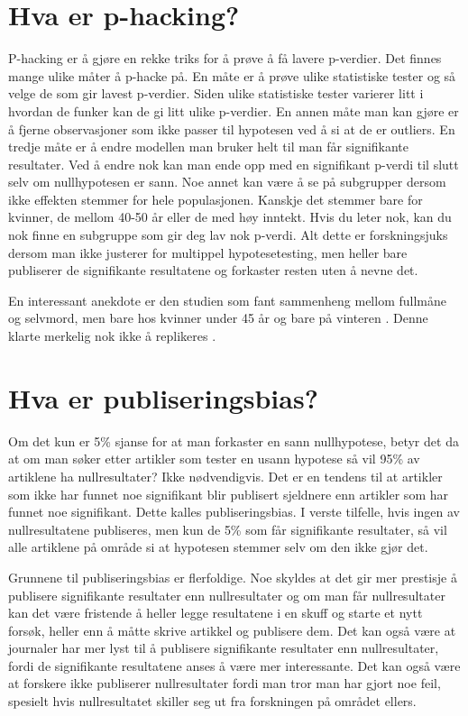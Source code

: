 \documentclass[doc,norsk]{apa7}
\begin{document}
\section{Hva er p-hacking?}
P-hacking er å gjøre en rekke triks for å prøve å få lavere p-verdier. Det finnes mange ulike måter å p-hacke på. En måte er å prøve ulike statistiske tester og så velge de som gir lavest p-verdier. Siden ulike statistiske tester varierer litt i hvordan de funker kan de gi litt ulike p-verdier. En annen måte man kan gjøre er å fjerne observasjoner som ikke passer til hypotesen ved å si at de er outliers. En tredje måte er å endre modellen man bruker helt til man får signifikante resultater. Ved å endre nok kan man ende opp med en signifikant p-verdi til slutt selv om nullhypotesen er sann. Noe annet kan være å se på subgrupper dersom ikke effekten stemmer for hele populasjonen. Kanskje det stemmer bare for kvinner, de mellom 40-50 år eller de med høy inntekt. Hvis du leter nok, kan du nok finne en subgruppe som gir deg lav nok p-verdi. Alt dette er forskningsjuks dersom man ikke justerer for multippel hypotesetesting, men heller bare publiserer de signifikante resultatene og forkaster resten uten å nevne det.

En interessant anekdote er den studien som fant sammenheng mellom fullmåne og selvmord, men bare hos kvinner under 45 år og bare på vinteren \parencite{selvmord-vinter-2}. Denne klarte merkelig nok ikke å replikeres \parencite{selvmord-vinter}.

\section{Hva er publiseringsbias?}
Om det kun er 5\% sjanse for at man forkaster en sann nullhypotese, betyr det da at om man søker etter artikler som tester en usann hypotese så vil 95\% av artiklene ha nullresultater? Ikke nødvendigvis. Det er en tendens til at artikler som ikke har funnet noe signifikant blir publisert sjeldnere enn artikler som har funnet noe signifikant. Dette kalles publiseringsbias. I verste tilfelle, hvis ingen av nullresultatene publiseres, men kun de 5\% som får signifikante resultater, så vil alle artiklene på område si at hypotesen stemmer selv om den ikke gjør det.

Grunnene til publiseringsbias er flerfoldige. Noe skyldes at det gir mer prestisje å publisere signifikante resultater enn nullresultater og om man får nullresultater kan det være fristende å heller legge resultatene i en skuff og starte et nytt forsøk, heller enn å måtte skrive artikkel og publisere dem. Det kan også være at journaler har mer lyst til å publisere signifikante resultater enn nullresultater, fordi de signifikante resultatene anses å være mer interessante. Det kan også være at forskere ikke publiserer nullresultater fordi man tror man har gjort noe feil, spesielt hvis nullresultatet skiller seg ut fra forskningen på området ellers.
\end{document}
